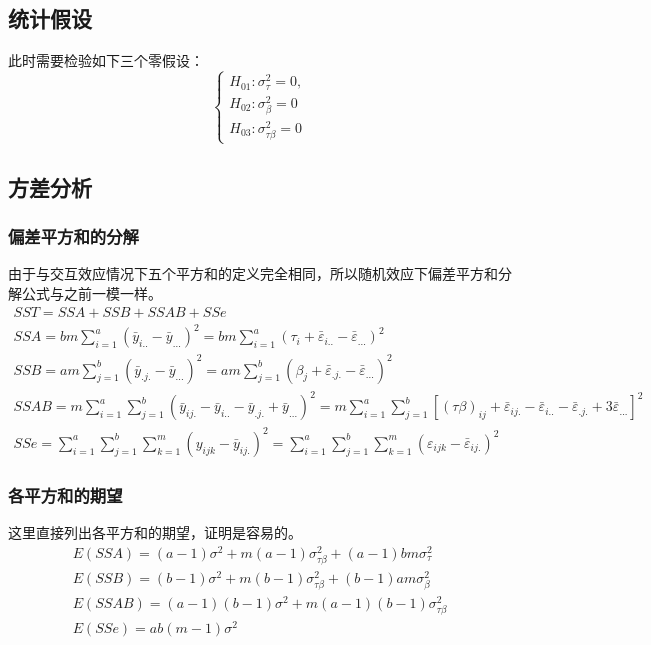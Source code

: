 \subsection{统计假设}
此时需要检验如下三个零假设：
\begin{equation*}
	\begin{cases}
		H_{01}:\sigma_\tau^2=0, \\
		H_{02}:\sigma_\beta^2=0 \\
		H_{03}:\sigma_{\tau\beta}^2=0
	\end{cases}
\end{equation*}

\subsection{方差分析}
\subsubsection{偏差平方和的分解}
由于与交互效应情况下五个平方和的定义完全相同，所以随机效应下偏差平方和分解公式与之前一模一样。
\begin{gather*}
	SST=SSA+SSB+SSAB+SSe \\
	SSA=bm\sum_{i=1}^a(\bar{y}_{i..}-\bar{y}_{...})^2=bm\sum_{i=1}^a(\tau_i+\bar{\varepsilon}_{i..}-\bar{\varepsilon}_{...})^2 \\
	SSB=am\sum_{j=1}^b(\bar{y}_{.j.}-\bar{y}_{...})^2=am\sum_{j=1}^b(\beta_j+\bar{\varepsilon}_{.j.}-\bar{\varepsilon}_{...})^2 \\
	SSAB=m\sum_{i=1}^a\sum_{j=1}^b(\bar{y}_{ij.}-\bar{y}_{i..}-\bar{y}_{.j.}+\bar{y}_{...})^2=m\sum_{i=1}^a\sum_{j=1}^b\left[(\tau\beta)_{ij}+\bar{\varepsilon}_{ij.}-\bar{\varepsilon}_{i..}-\bar{\varepsilon}_{.j.}+3\bar{\varepsilon}_{...}\right]^2 \\
	SSe=\sum_{i=1}^a\sum_{j=1}^b\sum_{k=1}^m(y_{ijk}-\bar{y}_{ij.})^2=\sum_{i=1}^a\sum_{j=1}^b\sum_{k=1}^m(\varepsilon_{ijk}-\bar{\varepsilon}_{ij.})^2
\end{gather*}
\subsubsection{各平方和的期望}
这里直接列出各平方和的期望，证明是容易的。
\begin{gather*}
	E(SSA)=(a-1)\sigma^2+m(a-1)\sigma_{\tau\beta}^2+(a-1)bm\sigma_\tau^2  \\
	E(SSB)=(b-1)\sigma^2+m(b-1)\sigma_{\tau\beta}^2+(b-1)am\sigma_{\beta}^2 \\
	E(SSAB)=(a-1)(b-1)\sigma^2+m(a-1)(b-1)\sigma_{\tau\beta}^2 \\
	E(SSe)=ab(m-1)\sigma^2
\end{gather*}
